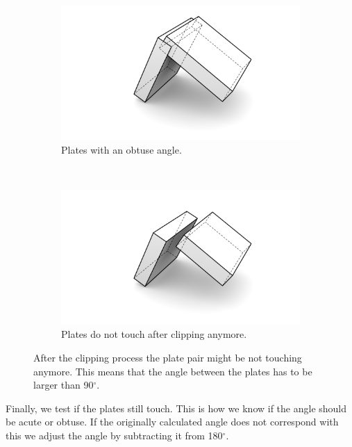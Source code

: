 \documentclass[../ClassicThesis.tex]{subfiles}
\begin{document}
\begin{figure}[!ht]
\begin{subfigure}[b]{0.45\textwidth}
\includegraphics[width=\columnwidth]{Images/Blocks_Intersecting.png}
\caption{Plates with an obtuse angle.}
\end{subfigure}
~
\begin{subfigure}[b]{0.45\textwidth}
\includegraphics[width=\columnwidth]{Images/Blocks_Intersecting_shortened.png}
\caption{Plates do not touch after clipping anymore.}
\end{subfigure}
\caption{After the clipping process the plate pair might be not touching anymore. This means that the angle between the plates has to be larger than 90$^\circ$.}
\label{fig:touchingOrNot}
\end{figure}

Finally, we test if the plates still touch. This is how we know if the angle should be acute or obtuse. If the originally calculated angle does not correspond with this we adjust the angle by subtracting it from 180$^\circ$.
\end{document}
